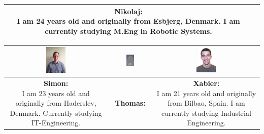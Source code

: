 \begin{table}[h]
\begin{tabular}{|c|c|c|c|}
{} 

&

\parbox[t] {0.2\textwidth}{
\textbf{Nikolaj:} \\
I am 24 years old and originally from Esbjerg, Denmark. I am currently studying M.Eng in Robotic Systems.
} 

\\\hline
\end{tabular}

\begin{tabular}{|c|c|c|}
\hline
\includegraphics[width=0.2\textwidth]{graphics/Simon_profile} & %
\includegraphics[width=0.2\textwidth]{graphics/AnonProfile} & %
\includegraphics[width=0.2\textwidth]{graphics/sexy_xabi_profile} \\ \hline %
\parbox[t] {0.2\textwidth}{
\textbf{Simon:} \\
I am 23 years old and originally from Haderslev, Denmark. Currently studying IT-Engineering.

} 

&

\parbox[t] {0.2\textwidth}{
\textbf{Thomas:} \\

} 

&

\parbox[t] {0.2\textwidth}{
\textbf{Xabier:} \\
I am 21 years old and originally from Bilbao, Spain. I am currently studying Industrial Engineering.
} 

\\\hline
\end{tabular}
\end{table}




